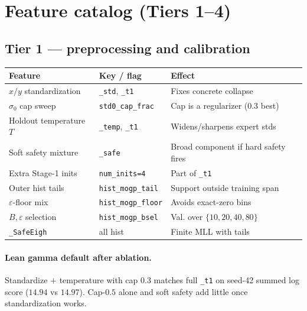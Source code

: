 \documentclass[11pt,a4paper]{article}
\theoremstyle{definition}
\begin{document}
\section{Feature catalog (Tiers 1--4)}
\label{sec:features}

\subsection{Tier 1 --- preprocessing and calibration}
\begin{center}
\renewcommand{\arraystretch}{1.05}
\small
\begin{tabular}{@{}llp{5.8cm}@{}}
\toprule
Feature & Key / flag & Effect \\
\midrule
$x/y$ standardization & \texttt{\_std}, \texttt{\_t1} & Fixes concrete collapse \\
$\sigma_0$ cap sweep & \texttt{std0\_cap\_frac} & Cap is a regularizer (0.3 best) \\
Holdout temperature $T$ & \texttt{\_temp}, \texttt{\_t1} & Widens/sharpens expert stds \\
Soft safety mixture & \texttt{\_safe} & Broad component if hard safety fires \\
Extra Stage-1 inits & \texttt{num\_inits=4} & Part of \texttt{\_t1} \\
Outer hist tails & \texttt{hist\_mogp\_tail} & Support outside training span \\
$\varepsilon$-floor mix & \texttt{hist\_mogp\_floor} & Avoids exact-zero bins \\
$B,\varepsilon$ selection & \texttt{hist\_mogp\_bsel} & Val. over $\{10,20,40,80\}$ \\
\texttt{\_SafeEigh} & all hist & Finite MLL with tails \\
\bottomrule
\end{tabular}
\end{center}

\paragraph{Lean gamma default after ablation.}
Standardize $+$ temperature with cap $0.3$ matches full \texttt{\_t1} on
seed-42 summed log score ($14.94$ vs $14.97$). Cap-$0.5$ alone and soft
safety add little once standardization works.
\end{document}
